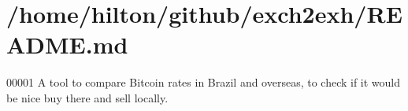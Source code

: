 \hypertarget{_r_e_a_d_m_e_8md_source}{}\section{/home/hilton/github/exch2exh/\+R\+E\+A\+D\+ME.md}

\begin{DoxyCode}
00001 A tool to compare Bitcoin rates in Brazil and overseas, to check if it would be nice buy there and
       sell locally.
\end{DoxyCode}
